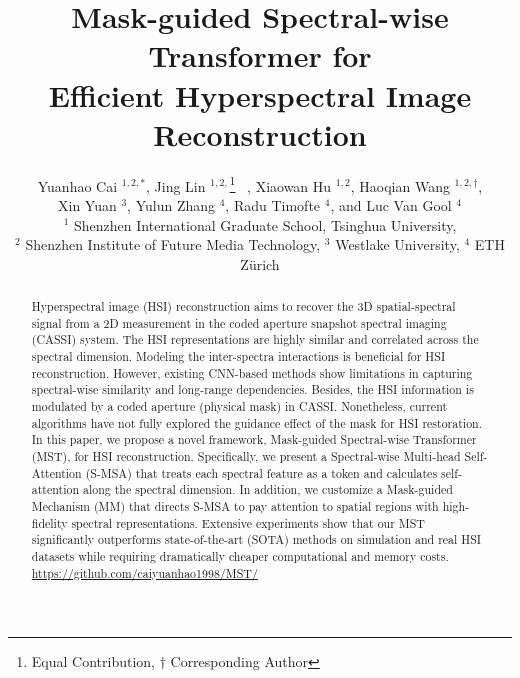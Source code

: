 \documentclass[10pt,twocolumn,letterpaper]{article}
\begin{document}
\title{Mask-guided Spectral-wise Transformer for \\ Efficient Hyperspectral Image Reconstruction}
\vspace{-3mm}
\author{Yuanhao Cai $^{1,2,*}$, Jing Lin $^{1,2,}$\thanks{Equal Contribution, $\dagger$ Corresponding Author} ~, Xiaowan Hu $^{1,2}$, Haoqian Wang $^{1,2,\dagger}$, \\ Xin Yuan $^3$, Yulun Zhang $^4$, Radu Timofte $^4$, and Luc Van Gool $^4$ \\
	$^{1}$ Shenzhen International Graduate School, Tsinghua University, \\ $^2$  Shenzhen Institute of Future Media Technology, $^3$ Westlake University, $^4$ ETH Z\"{u}rich
}
\maketitle

\begin{abstract}
\vspace{-2mm}
Hyperspectral image (HSI) reconstruction aims to recover the 3D spatial-spectral signal from a 2D measurement in the coded aperture snapshot spectral imaging  (CASSI) system. The HSI  representations are highly similar and correlated across the spectral dimension. Modeling the inter-spectra interactions is beneficial for HSI reconstruction. However, existing CNN-based methods show limitations in capturing spectral-wise similarity and long-range dependencies. Besides, the HSI information is modulated by a coded aperture (physical mask) in CASSI. Nonetheless, current algorithms have not fully explored the guidance effect of the mask for HSI restoration. In this paper, we propose a novel framework, Mask-guided Spectral-wise Transformer (MST), for HSI reconstruction. Specifically, we present a Spectral-wise Multi-head Self-Attention (S-MSA) that treats each spectral feature as a token and calculates self-attention along the spectral dimension. In addition, we customize a Mask-guided Mechanism (MM) that directs S-MSA to pay attention to spatial regions with high-fidelity spectral representations. Extensive experiments show that our MST significantly outperforms state-of-the-art (SOTA) methods on simulation and real HSI datasets while requiring dramatically cheaper computational and memory costs. \url{https://github.com/caiyuanhao1998/MST/}
\end{abstract}

\vspace{-4mm}
\end{document}
